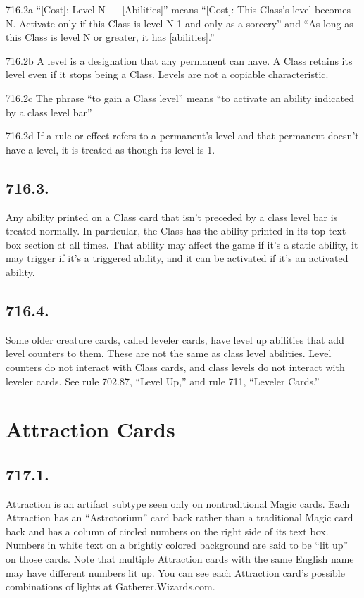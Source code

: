 716.2a “[Cost]: Level N — [Abilities]” means “[Cost]: This Class’s level becomes N. Activate only if this Class is level N-1 and only as a sorcery” and “As long as this Class is level N or greater, it has [abilities].”

716.2b A level is a designation that any permanent can have. A Class retains its level even if it stops being a Class. Levels are not a copiable characteristic.

716.2c The phrase “to gain a Class level” means “to activate an ability indicated by a class level bar”

716.2d If a rule or effect refers to a permanent’s level and that permanent doesn’t have a level, it is treated as though its level is 1.

\subsection*{716.3.}
Any ability printed on a Class card that isn’t preceded by a class level bar is treated normally. In particular, the Class has the ability printed in its top text box section at all times. That ability may affect the game if it’s a static ability, it may trigger if it’s a triggered ability, and it can be activated if it’s an activated ability.

\subsection*{716.4.}
Some older creature cards, called leveler cards, have level up abilities that add level counters to them. These are not the same as class level abilities. Level counters do not interact with Class cards, and class levels do not interact with leveler cards. See rule 702.87, “Level Up,” and rule 711, “Leveler Cards.”

\section{Attraction Cards}
\subsection*{717.1.}
Attraction is an artifact subtype seen only on nontraditional Magic cards. Each Attraction has an “Astrotorium” card back rather than a traditional Magic card back and has a column of circled numbers on the right side of its text box. Numbers in white text on a brightly colored background are said to be “lit up” on those cards. Note that multiple Attraction cards with the same English name may have different numbers lit up. You can see each Attraction card’s possible combinations of lights at Gatherer.Wizards.com.

